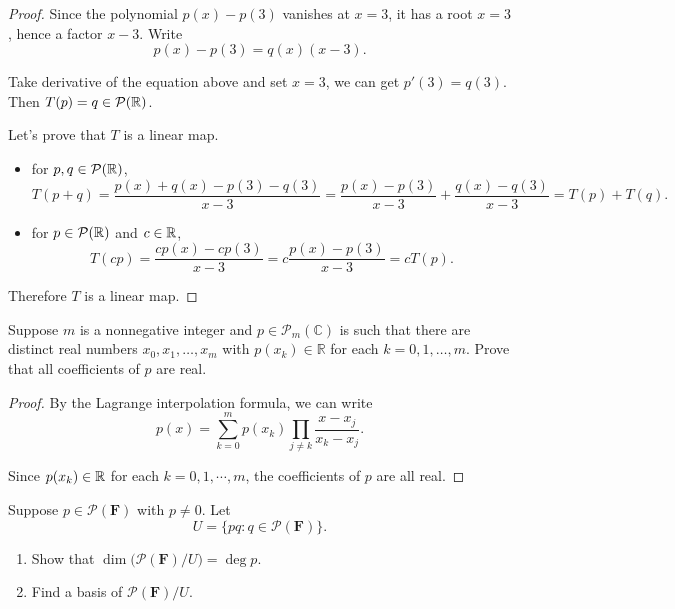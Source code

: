 \documentclass{article}
\begin{document}
\begin{proof}
  Since the polynomial \( p(x)-p(3) \) vanishes at \( x=3 \), it has a root \( x=3 \), hence a factor \( x-3 \). Write
  \[ p(x)-p(3)=q(x)(x-3). \] \par
  Take derivative of the equation above and set \( x=3 \), we can get \( p'(3)=q(3) \).  Then \( T(p)=q\in \mathcal{P}(\mathbb{R}) \).\par
  Let's prove that \( T \) is a linear map. \begin{itemize}
    \item for \( p,q\in \mathcal{P}(\mathbb{R}) \), 
    \[ T(p+q)=\frac{p(x)+q(x)-p(3)-q(3)}{x-3}=\frac{p(x)-p(3)}{x-3}+\frac{q(x)-q(3)}{x-3}=T(p)+T(q). \]
    \item for \( p\in \mathcal{P}(\mathbb{R}) \) and \( c\in \mathbb{R} \),
    \[ T(cp)=\frac{cp(x)-cp(3)}{x-3}=c\frac{p(x)-p(3)}{x-3}=cT(p). \]
  \end{itemize}\par
  Therefore \( T \) is a linear map.
\end{proof}

\begin{problem}[4-12]
  Suppose $m$ is a nonnegative integer and $p\in\mathcal{P}_m(\mathbb{C})$ is
  such that there are distinct real numbers $x_0,x_1,\ldots,x_m$ with
  $p(x_k)\in\mathbb{R}$ for each $k=0,1,\ldots,m$. Prove that all coefficients
  of $p$ are real.
\end{problem}

\begin{proof}
  By the Lagrange interpolation formula, we can write
  \[ p(x)=\sum_{k=0}^{m}p(x_k)\prod_{j\neq k}\frac{x-x_j}{x_k-x_j}. \] \par
  Since \( p(x_k)\in \mathbb{R} \) for each \( k=0,1,\cdots,m \), the coefficients of \( p \) are all real.
\end{proof}

\begin{problem}[4-13]
  Suppose $p\in\mathcal{P}(\mathbf{F})$ with $p\neq 0$. Let
  \[
  U=\{pq:q\in\mathcal{P}(\mathbf{F})\}.
  \]
  \begin{enumerate}
    \item Show that $\dim\bigl(\mathcal{P}(\mathbf{F})/U\bigr)=\deg p$.
    \item Find a basis of $\mathcal{P}(\mathbf{F})/U$.
  \end{enumerate}
\end{problem}
\end{document}
